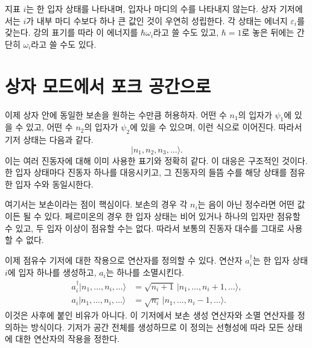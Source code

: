 지표 \(i\)는 한 입자 상태를 나타내며, 입자나 마디의 수를 나타내지 않는다. 상자 기저에서는 \(i\)가 내부 마디 수보다 하나 큰 값인 것이 우연히 성립한다. 각 상태는 에너지 \(\varepsilon_i\)를 갖는다. 강의 표기를 따라 이 에너지를 \(\hbar\omega_i\)라고 쓸 수도 있고, \(\hbar=1\)로 놓은 뒤에는 간단히 \(\omega_i\)라고 쓸 수도 있다.

\begin{classroomqa}\end{classroomqa}

\begin{classroomqa}\end{classroomqa}

\section{상자 모드에서 포크 공간으로}

이제 상자 안에 동일한 보손을 원하는 수만큼 허용하자. 어떤 수 \(n_1\)의 입자가 \(\psi_1\)에 있을 수 있고, 어떤 수 \(n_2\)의 입자가 \(\psi_2\)에 있을 수 있으며, 이런 식으로 이어진다. 따라서 기저 상태는 다음과 같다.
\begin{equation}
|n_1,n_2,n_3,\ldots\rangle.
\end{equation}
이는 여러 진동자에 대해 이미 사용한 표기와 정확히 같다. 이 대응은 구조적인 것이다. 한 입자 상태마다 진동자 하나를 대응시키고, 그 진동자의 들뜸 수를 해당 상태를 점유한 입자 수와 동일시한다.

여기서는 보손이라는 점이 핵심이다. 보손의 경우 각 \(n_i\)는 음이 아닌 정수라면 어떤 값이든 될 수 있다. 페르미온의 경우 한 입자 상태는 비어 있거나 하나의 입자만 점유할 수 있고, 두 입자 이상이 점유할 수는 없다. 따라서 보통의 진동자 대수를 그대로 사용할 수 없다.

이제 점유수 기저에 대한 작용으로 연산자를 정의할 수 있다. 연산자 \(a_i^\dagger\)는 한 입자 상태 \(i\)에 입자 하나를 생성하고, \(a_i\)는 하나를 소멸시킨다.
\begin{align}
a_i^\dagger|n_1,\ldots,n_i,\ldots\rangle
&=\sqrt{n_i+1}\,|n_1,\ldots,n_i+1,\ldots\rangle, \\
a_i|n_1,\ldots,n_i,\ldots\rangle
&=\sqrt{n_i}\,|n_1,\ldots,n_i-1,\ldots\rangle.
\end{align}
이것은 사후에 붙인 비유가 아니다. 이 기저에서 보손 생성 연산자와 소멸 연산자를 정의하는 방식이다. 기저가 공간 전체를 생성하므로 이 정의는 선형성에 따라 모든 상태에 대한 연산자의 작용을 정한다.

